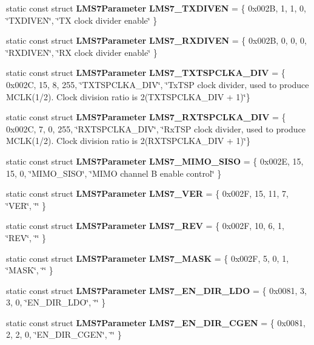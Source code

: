 \begin{DoxyCompactItemize}
\item 
static const struct {\bf L\+M\+S7\+Parameter} {\bf L\+M\+S7\+\_\+\+T\+X\+D\+I\+V\+EN} = \{ 0x002\+B, 1, 1, 0, \char`\"{}\+T\+X\+D\+I\+V\+E\+N\char`\"{}, \char`\"{}\+T\+X clock divider enable\char`\"{} \}
\item 
static const struct {\bf L\+M\+S7\+Parameter} {\bf L\+M\+S7\+\_\+\+R\+X\+D\+I\+V\+EN} = \{ 0x002\+B, 0, 0, 0, \char`\"{}\+R\+X\+D\+I\+V\+E\+N\char`\"{}, \char`\"{}\+R\+X clock divider enable\char`\"{} \}
\item 
static const struct {\bf L\+M\+S7\+Parameter} {\bf L\+M\+S7\+\_\+\+T\+X\+T\+S\+P\+C\+L\+K\+A\+\_\+\+D\+IV} = \{ 0x002\+C, 15, 8, 255, \char`\"{}\+T\+X\+T\+S\+P\+C\+L\+K\+A\+\_\+\+D\+I\+V\char`\"{}, \char`\"{}\+Tx\+T\+S\+P clock divider, used to produce M\+C\+L\+K(1/2). Clock division ratio is 2(\+T\+X\+T\+S\+P\+C\+L\+K\+A\+\_\+\+D\+I\+V + 1)\char`\"{}\}
\item 
static const struct {\bf L\+M\+S7\+Parameter} {\bf L\+M\+S7\+\_\+\+R\+X\+T\+S\+P\+C\+L\+K\+A\+\_\+\+D\+IV} = \{ 0x002\+C, 7, 0, 255, \char`\"{}\+R\+X\+T\+S\+P\+C\+L\+K\+A\+\_\+\+D\+I\+V\char`\"{}, \char`\"{}\+Rx\+T\+S\+P clock divider, used to produce M\+C\+L\+K(1/2). Clock division ratio is 2(\+R\+X\+T\+S\+P\+C\+L\+K\+A\+\_\+\+D\+I\+V + 1)\char`\"{}\}
\item 
static const struct {\bf L\+M\+S7\+Parameter} {\bf L\+M\+S7\+\_\+\+M\+I\+M\+O\+\_\+\+S\+I\+SO} = \{ 0x002\+E, 15, 15, 0, \char`\"{}\+M\+I\+M\+O\+\_\+\+S\+I\+S\+O\char`\"{}, \char`\"{}\+M\+I\+M\+O channel B enable control\char`\"{} \}
\item 
static const struct {\bf L\+M\+S7\+Parameter} {\bf L\+M\+S7\+\_\+\+V\+ER} = \{ 0x002\+F, 15, 11, 7, \char`\"{}\+V\+E\+R\char`\"{}, \char`\"{}\char`\"{} \}
\item 
static const struct {\bf L\+M\+S7\+Parameter} {\bf L\+M\+S7\+\_\+\+R\+EV} = \{ 0x002\+F, 10, 6, 1, \char`\"{}\+R\+E\+V\char`\"{}, \char`\"{}\char`\"{} \}
\item 
static const struct {\bf L\+M\+S7\+Parameter} {\bf L\+M\+S7\+\_\+\+M\+A\+SK} = \{ 0x002\+F, 5, 0, 1, \char`\"{}\+M\+A\+S\+K\char`\"{}, \char`\"{}\char`\"{} \}
\item 
static const struct {\bf L\+M\+S7\+Parameter} {\bf L\+M\+S7\+\_\+\+E\+N\+\_\+\+D\+I\+R\+\_\+\+L\+DO} = \{ 0x0081, 3, 3, 0, \char`\"{}\+E\+N\+\_\+\+D\+I\+R\+\_\+\+L\+D\+O\char`\"{}, \char`\"{}\char`\"{} \}
\item 
static const struct {\bf L\+M\+S7\+Parameter} {\bf L\+M\+S7\+\_\+\+E\+N\+\_\+\+D\+I\+R\+\_\+\+C\+G\+EN} = \{ 0x0081, 2, 2, 0, \char`\"{}\+E\+N\+\_\+\+D\+I\+R\+\_\+\+C\+G\+E\+N\char`\"{}, \char`\"{}\char`\"{} \}

\end{DoxyCompactItemize}
